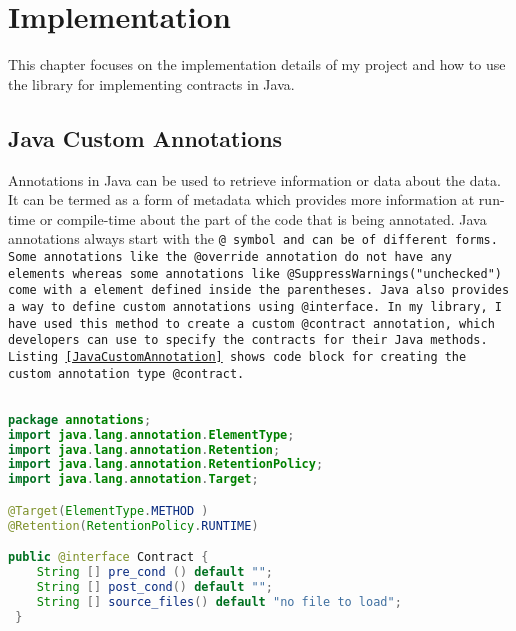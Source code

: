 \chapter{Implementation}

This chapter focuses on the implementation details of my project and how to use the library for implementing contracts in Java.

\section{Java Custom Annotations}

Annotations in Java can be used to retrieve information or data about the data. It can be termed as a form of metadata which provides more information at run-time or compile-time about the part of the code that is being annotated. Java annotations always start with the \tt{@} symbol and can be of different forms. Some annotations like the \tt{@override} annotation do not have any elements whereas some annotations like \tt{@SuppressWarnings("unchecked")} come with a element defined inside the parentheses. 
Java also provides a way to define custom annotations using \tt{@interface}. In my library, I have used this method to create a custom \tt{@contract} annotation, which developers can use to specify the contracts for their Java methods.
Listing \ref{JavaCustomAnnotation} shows code block for creating the custom annotation type \tt{@contract}.

\begin{minipage}{\linewidth}      
\begin{lstlisting}[frame=single, language=Java, caption={Custom Annotation Type}, label={JavaCustomAnnotation}, captionpos=b, breaklines=true, showstringspaces=false]

package annotations;
import java.lang.annotation.ElementType;
import java.lang.annotation.Retention;
import java.lang.annotation.RetentionPolicy;
import java.lang.annotation.Target;

@Target(ElementType.METHOD )
@Retention(RetentionPolicy.RUNTIME)

public @interface Contract {
	String [] pre_cond () default "";
	String [] post_cond() default "";
	String [] source_files() default "no file to load";
 }

\end{lstlisting}
\end{minipage}


